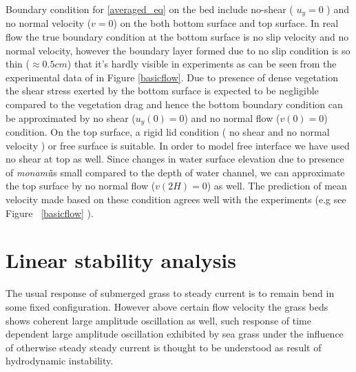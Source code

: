 \documentclass[12pt]{report}   %
\newcommand{\monami}{\textit{monami}}
\begin{document}
Boundary condition for \eqref{averaged_eq} on the bed include no-shear ( $u_y=0$ ) and no normal velocity ($v=0$) on the both bottom surface and top surface.
In real flow the true boundary condition at the bottom surface is no slip velocity and no normal velocity, however the boundary layer formed due to no slip condition is so thin ($\approx 0.5 cm$) that it's hardly visible in experiments as can be seen from the experimental data of \cite{Nepf04} in Figure \ref{basicflow}. Due to presence of dense vegetation the shear stress exerted by the bottom surface is expected to be negligible compared to the vegetation drag \cite{Nepf04} and hence the bottom boundary condition can be approximated by no shear ($u_y(0)=0$) and no normal flow ($v(0)=0$) condition.
On the top surface, a rigid lid condition ( no shear and no normal velocity ) or free surface is suitable. In order to model free interface we have used no shear at top as well. Since changes in water surface elevation due to presence of \monami  is small compared to the depth of water channel, we can approximate the top surface by no normal flow ($v(2H)=0$) as well.  %
 The prediction of mean velocity made based on these condition agrees well with the experiments (e.g see Figure ~\ref{basicflow} ). 
%
\clearpage{\pagestyle{empty}\cleardoublepage}
\chapter{Linear stability analysis}
The usual response of submerged grass to steady current is to remain bend in some fixed configuration. However above certain flow velocity the grass beds shows coherent large amplitude oscillation as well, such response of time dependent large amplitude oscillation exhibited by sea grass under the influence of otherwise steady steady current is thought to be understood as result of hydrodynamic instability. 
\end{document}
